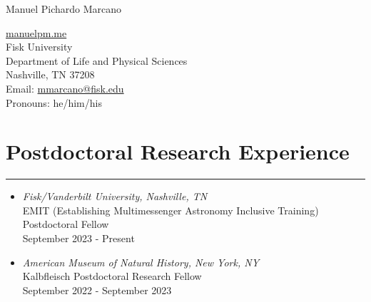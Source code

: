\documentclass[letterpaper,10pt]{article}
\def\name{Manuel Pichardo Marcano}
\begin{document}
\begin{huge}
\name
\end{huge}





\vspace{.3 cm}

\begin{minipage}{0.6\linewidth}
  \href{www.manuelpm.me}{manuelpm.me} \\
Fisk University \\
  Department of Life and Physical Sciences \\
  Nashville, TN 37208\\
Email:  \href{mailto:mmarcano@fisk.edu}{mmarcano@fisk.edu}\\
 Pronouns: he/him/his 
\end{minipage}



\section*{Postdoctoral Research Experience}

\hrule
\vspace{.3 cm}
\begin{itemize}[label=$\blacktriangleright$]


 \item \emph{Fisk/Vanderbilt University, Nashville, TN}\\
 EMIT (Establishing Multimessenger Astronomy Inclusive Training) Postdoctoral Fellow \\
 September 2023 - Present



 \item \emph{American Museum of Natural History, New York, NY}\\
 Kalbfleisch Postdoctoral Research Fellow \\
 September 2022 - September 2023

\end{itemize}
\end{document}
